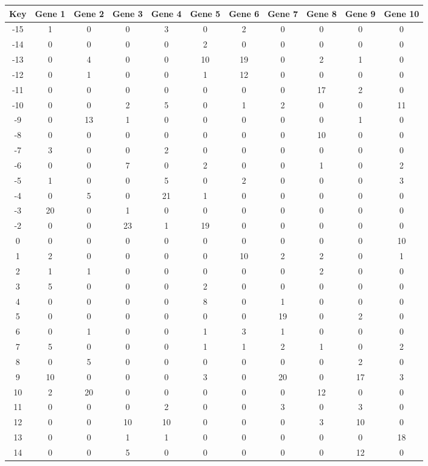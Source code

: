 \begin{tabular}{|c|c|c|c|c|c|c|c|c|c|c|}
\hline
Key & Gene 1 & Gene 2 & Gene 3 & Gene 4 & Gene 5 & Gene 6 & Gene 7 & Gene 8 & Gene 9 & Gene 10 \\
\hline
-15 & 1 & 0 & 0 & 3 & 0 & 2 & 0 & 0 & 0 & 0 \\
-14 & 0 & 0 & 0 & 0 & 2 & 0 & 0 & 0 & 0 & 0 \\
-13 & 0 & 4 & 0 & 0 & 10 & 19 & 0 & 2 & 1 & 0 \\
-12 & 0 & 1 & 0 & 0 & 1 & 12 & 0 & 0 & 0 & 0 \\
-11 & 0 & 0 & 0 & 0 & 0 & 0 & 0 & 17 & 2 & 0 \\
-10 & 0 & 0 & 2 & 5 & 0 & 1 & 2 & 0 & 0 & 11 \\
-9 & 0 & 13 & 1 & 0 & 0 & 0 & 0 & 0 & 1 & 0 \\
-8 & 0 & 0 & 0 & 0 & 0 & 0 & 0 & 10 & 0 & 0 \\
-7 & 3 & 0 & 0 & 2 & 0 & 0 & 0 & 0 & 0 & 0 \\
-6 & 0 & 0 & 7 & 0 & 2 & 0 & 0 & 1 & 0 & 2 \\
-5 & 1 & 0 & 0 & 5 & 0 & 2 & 0 & 0 & 0 & 3 \\
-4 & 0 & 5 & 0 & 21 & 1 & 0 & 0 & 0 & 0 & 0 \\
-3 & 20 & 0 & 1 & 0 & 0 & 0 & 0 & 0 & 0 & 0 \\
-2 & 0 & 0 & 23 & 1 & 19 & 0 & 0 & 0 & 0 & 0 \\
0 & 0 & 0 & 0 & 0 & 0 & 0 & 0 & 0 & 0 & 10 \\
1 & 2 & 0 & 0 & 0 & 0 & 10 & 2 & 2 & 0 & 1 \\
2 & 1 & 1 & 0 & 0 & 0 & 0 & 0 & 2 & 0 & 0 \\
3 & 5 & 0 & 0 & 0 & 2 & 0 & 0 & 0 & 0 & 0 \\
4 & 0 & 0 & 0 & 0 & 8 & 0 & 1 & 0 & 0 & 0 \\
5 & 0 & 0 & 0 & 0 & 0 & 0 & 19 & 0 & 2 & 0 \\
6 & 0 & 1 & 0 & 0 & 1 & 3 & 1 & 0 & 0 & 0 \\
7 & 5 & 0 & 0 & 0 & 1 & 1 & 2 & 1 & 0 & 2 \\
8 & 0 & 5 & 0 & 0 & 0 & 0 & 0 & 0 & 2 & 0 \\
9 & 10 & 0 & 0 & 0 & 3 & 0 & 20 & 0 & 17 & 3 \\
10 & 2 & 20 & 0 & 0 & 0 & 0 & 0 & 12 & 0 & 0 \\
11 & 0 & 0 & 0 & 2 & 0 & 0 & 3 & 0 & 3 & 0 \\
12 & 0 & 0 & 10 & 10 & 0 & 0 & 0 & 3 & 10 & 0 \\
13 & 0 & 0 & 1 & 1 & 0 & 0 & 0 & 0 & 0 & 18 \\
14 & 0 & 0 & 5 & 0 & 0 & 0 & 0 & 0 & 12 & 0 \\
\hline
\end{tabular}